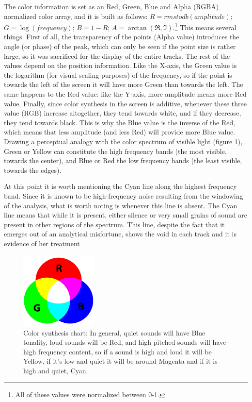 \documentclass{article}
\begin{document}
\newpage
The color information is set as an Red, Green, Blue and Alpha (RGBA) normalized color array, and it is built as follows: $R=\mathit{rmstodb}(\mathit{amplitude})$;  $G=\log (\mathit{frequency})$;  $B=1-R$;  $A=\arctan (\Re ,\Im )$.\footnote{All of these values were normalized between 0-1.} This means several things. First of all, the transparency of the points (Alpha value) introduces the angle (or phase) of the peak, which can only be seen if the point size is rather large, so it was sacrificed for the display of the entire tracks. The rest of the values depend on the position information. Like the X-axis, the Green value is the logarithm (for visual scaling purposes) of the frequency, so if the point is towards the left of the screen it will have more Green than towards the left. The same happens to the Red value: like the Y-axis, more amplitude means more Red value. Finally, since color synthesis in the screen is additive, whenever these three value (RGB) increase altogether, they tend towards white, and if they decrease, they tend towards black. This is why the Blue value is the inverse of the Red, which means that less amplitude (and less Red) will provide more Blue value. Drawing a perceptual analogy with the color spectrum of visible light (figure 1), Green or Yellow can constitute the high frequency bands (the most visible, towards the center), and Blue or Red the low frequency bands (the least visible, towards the edges).

\bigskip
At this point it is worth mentioning the Cyan line along the highest frequency band. Since it is known to be high-frequency noise resulting from the windowing of the analysis, what is worth noting is whenever this line is absent. The Cyan line means that while it is present, either silence or very small grains of sound are present in other regions of the spectrum. This line, despite the fact that it emerges out of an analytical misfortune, shows the void in each track and it is evidence of her treatment 
\begin{figure}
\begin{center}
\includegraphics[width=1.5161in,height=1.5161in]{foryoungears-img004.png}
 \caption{Color synthesis chart: In general, quiet sounds will have Blue tonality, loud sounds will be Red, and high-pitched sounds will have high frequency content, so if a sound is high and loud it will be Yellow, if it's low and quiet it will be around Magenta and if it is high and quiet, Cyan.}
\end{center}
\end{figure}
\end{document}
